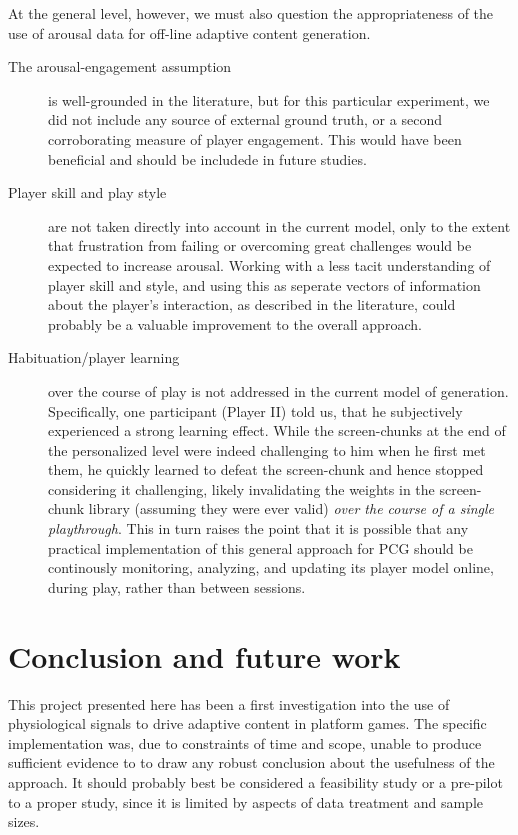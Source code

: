 \documentclass{llncs}
\begin{document}
At the general level, however, we must also question the appropriateness of the use of arousal data for off-line adaptive content generation.
\begin{description}
\item [The arousal-engagement assumption] is well-grounded in the literature, but for this particular experiment, we did not include any source of external ground truth, or a second corroborating measure of player engagement. This would have been beneficial and should be includede in future studies.
\item [Player skill and play style] are not taken directly into account in the current model, only to the extent that frustration from failing or overcoming great challenges would be expected to increase arousal. Working with a less tacit understanding of player skill and style, and using this as seperate vectors of information about the player's interaction, as described in the literature\cite{shaker2010towards}, could probably be a valuable improvement to the overall approach.
\item [Habituation/player learning] over the course of play is not addressed in the current model of generation. Specifically, one participant (Player II) told us, that he subjectively experienced a strong learning effect. While the screen-chunks at the end of the personalized level were indeed challenging to him when he first met them, he quickly learned to defeat the screen-chunk and hence stopped considering it challenging, likely invalidating the weights in the screen-chunk library (assuming they were ever valid) \emph{over the course of a single playthrough}. This in turn raises the point that it is possible that any practical implementation of this general approach for PCG should be continously monitoring, analyzing, and updating its player model online, during play, rather than between sessions.
\end{description}

\section{Conclusion and future work}
This project presented here has been a first investigation into the use of physiological signals to drive adaptive content in platform games. The specific implementation was, due to constraints of time and scope, unable to produce sufficient evidence to to draw any robust conclusion about the usefulness of the approach. It should probably best be considered a feasibility study or a pre-pilot to a proper study, since it is limited by aspects of data treatment and sample sizes.
\end{document}
